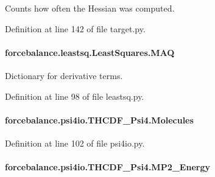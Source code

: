 Counts how often the Hessian was computed. 



Definition at line 142 of file target.\-py.

\hypertarget{classforcebalance_1_1leastsq_1_1LeastSquares_a7f08641f45285414b080f21ed278f31e}{
\paragraph[{M\-A\-Q}]{\setlength{\rightskip}{0pt plus 5cm}forcebalance.\-leastsq.\-Least\-Squares.\-M\-A\-Q\hspace{0.3cm}{\ttfamily [inherited]}}}\label{classforcebalance_1_1leastsq_1_1LeastSquares_a7f08641f45285414b080f21ed278f31e}


Dictionary for derivative terms. 



Definition at line 98 of file leastsq.\-py.

\hypertarget{classforcebalance_1_1psi4io_1_1THCDF__Psi4_a3f3231f0970970f6ce93c87673728fcd}{
\paragraph[{Molecules}]{\setlength{\rightskip}{0pt plus 5cm}forcebalance.\-psi4io.\-T\-H\-C\-D\-F\-\_\-\-Psi4.\-Molecules}}\label{classforcebalance_1_1psi4io_1_1THCDF__Psi4_a3f3231f0970970f6ce93c87673728fcd}


Definition at line 102 of file psi4io.\-py.

\hypertarget{classforcebalance_1_1psi4io_1_1THCDF__Psi4_a88f28862f46d19b0c36fc22967265715}{
\paragraph[{M\-P2\-\_\-\-Energy}]{\setlength{\rightskip}{0pt plus 5cm}forcebalance.\-psi4io.\-T\-H\-C\-D\-F\-\_\-\-Psi4.\-M\-P2\-\_\-\-Energy}}\label{classforcebalance_1_1psi4io_1_1THCDF__Psi4_a88f28862f46d19b0c36fc22967265715}



